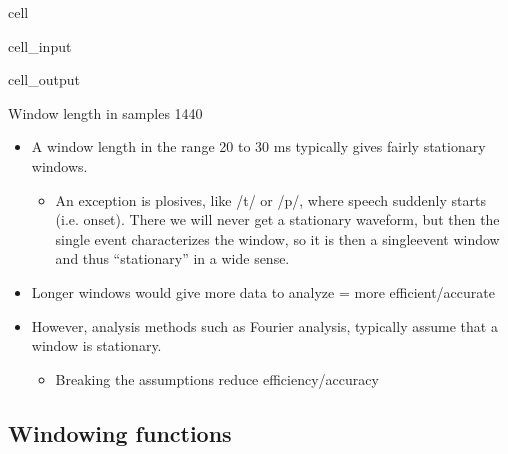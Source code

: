 \documentclass[letterpaper,10pt,english]{jupyterBook}
\begin{document}
\begin{sphinxuseclass}{cell}
\begin{sphinxVerbatimInput}
\begin{sphinxuseclass}{cell_input}
\end{sphinxuseclass}\end{sphinxVerbatimInput}
\begin{sphinxVerbatimOutput}

\begin{sphinxuseclass}{cell_output}
\begin{sphinxVerbatim}[commandchars=\\\{\}]
Window length in samples 1440
\end{sphinxVerbatim}

\noindent{}

\end{sphinxuseclass}\end{sphinxVerbatimOutput}

\end{sphinxuseclass}\begin{itemize}
\item {} 
\sphinxAtStartPar
A window length in the range 20 to 30 ms typically gives fairly stationary windows.
\begin{itemize}
\item {} 
\sphinxAtStartPar
An exception is plosives, like /t/ or /p/, where speech suddenly starts (i.e. onset). There we will never get a stationary waveform, but then the single event characterizes the window, so it is then a single\sphinxhyphen{}event window and thus “stationary” in a wide sense.

\end{itemize}

\item {} 
\sphinxAtStartPar
Longer windows would give more data to analyze = more efficient/accurate

\item {} 
\sphinxAtStartPar
However, analysis methods such as Fourier analysis, typically assume that a window is stationary.
\begin{itemize}
\item {} 
\sphinxAtStartPar
Breaking the assumptions reduce efficiency/accuracy

\end{itemize}

\end{itemize}


\subsection{Windowing functions}
\label{\detokenize{Representations/Short-time_analysis:windowing-functions}}
\end{document}
